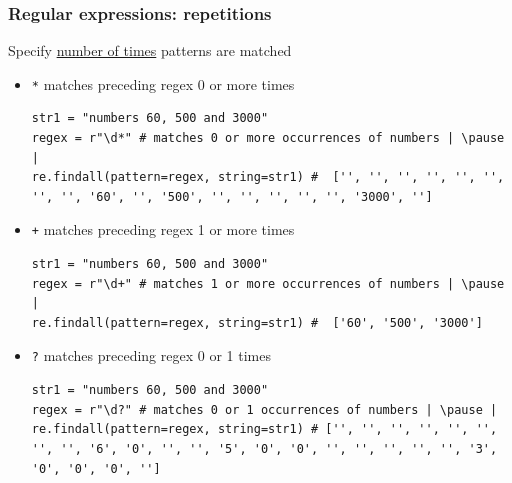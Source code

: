 \documentclass[xcolor=table]{beamer}
\begin{document}

\begin{frame}[fragile]
    \frametitle{Regular expressions: repetitions}
    Specify \href{https://docs.python.org/3.7/library/re.html#regular-expression-syntax}{number of times} patterns are matched
    \begin{itemize} \pause
        \item\texttt{*} matches preceding regex 0 or more times \pause
\begin{lstlisting}[style=python,belowskip=-1.5 \baselineskip]
str1 = "numbers 60, 500 and 3000"
regex = r"\d*" # matches 0 or more occurrences of numbers | \pause |  
re.findall(pattern=regex, string=str1) #  ['', '', '', '', '', '', '', '', '60', '', '500', '', '', '', '', '', '3000', '']
\end{lstlisting} \pause
        \item\texttt{+} matches preceding regex 1 or more times \pause
\begin{lstlisting}[style=python,belowskip=-1.5 \baselineskip]
str1 = "numbers 60, 500 and 3000"
regex = r"\d+" # matches 1 or more occurrences of numbers | \pause |  
re.findall(pattern=regex, string=str1) #  ['60', '500', '3000']
\end{lstlisting} \pause
        \item\texttt{?} matches preceding regex 0 or 1 times \pause
\begin{lstlisting}[style=python,belowskip=-1.5 \baselineskip]
str1 = "numbers 60, 500 and 3000"
regex = r"\d?" # matches 0 or 1 occurrences of numbers | \pause |  
re.findall(pattern=regex, string=str1) # ['', '', '', '', '', '', '', '', '6', '0', '', '', '5', '0', '0', '', '', '', '', '', '3', '0', '0', '0', '']
\end{lstlisting} 
    \end{itemize}
\end{frame}
\end{document}
